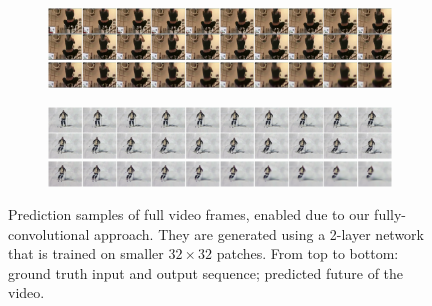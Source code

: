 \begin{figure}[h!tb]
\centering
\begin{subfigure}{1.0\textwidth}
  \centering
  \includegraphics[width=1.0\linewidth]{figures/pred/ucf/full/pred-00.png}
  \caption{}
  \label{fig:ucf-full1a}
  \vspace{.1cm}
\end{subfigure}
\begin{subfigure}{1.0\textwidth}
  \centering
  \includegraphics[width=1.0\linewidth]{figures/pred/ucf/full/pred-01.png}
  \caption{}
  \label{fig:ucf-full1b}
  \vspace{.1cm}
\end{subfigure}
\caption[Full Frame Prediction Sample on UCF-101]{Prediction samples of full video frames, enabled due to our fully-convolutional approach. They are generated using a 2-layer network that is trained on smaller $32 \times 32$ patches. From top to bottom: ground truth input and output sequence; predicted future of the video.}
\label{fig:ucf-full1}
\end{figure}
